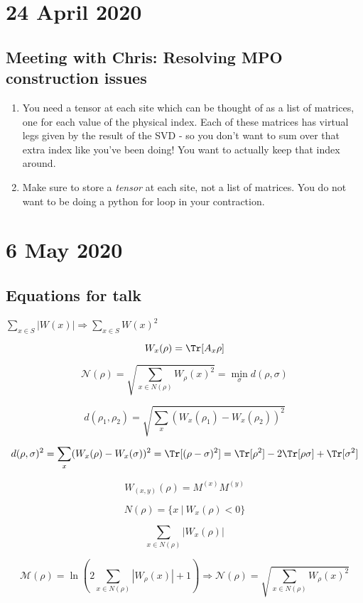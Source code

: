 \documentclass{report}
\begin{document}
\chapter{24 April 2020}

\section{Meeting with Chris: Resolving MPO construction issues}

\begin{enumerate}
\item You need a tensor at each site which can be thought of as a list of matrices, one for each value of the physical index. Each of these matrices has virtual legs given by the result of the SVD - so you don't want to sum over that extra index like you've been doing! You want to actually keep that index around. 
\item Make sure to store a \textit{tensor} at each site, not a list of matrices. You do not want to be doing a python for loop in your contraction.
\end{enumerate}

\chapter{6 May 2020}

\section{Equations for talk}

$\sum_{x\in S} |W(x)|\Rightarrow \sum_{x\in S} W(x)^2$

\[W_x(\rho)=\Tr[A_x\rho]\]

\[\mathcal N(\rho)=\sqrt{\sum_{x\in N(\rho)} W_\rho(x)^2}=\min_\sigma d(\rho,\sigma)\]

\[d(\rho_1,\rho_2)=\sqrt{\sum_x(W_x(\rho_1)-W_x(\rho_2))^2}\]

\[d(\rho,\sigma)^2=\sum_x(W_x(\rho)-W_x(\sigma))^2=\Tr[(\rho-\sigma)^2]=\Tr[\rho^2]-2\Tr[\rho\sigma]+\Tr[\sigma^2]\]

\[W_{(x,y)}(\rho)=M^{(x)}M^{(y)}\]

\[N(\rho)=\{x\ |\ W_x(\rho)<0\}\]

\[\sum_{x\in N(\rho)}|W_x(\rho)|\]

\[\mathcal M(\rho)=\ln\left(2 \sum_{x\in N(\rho)}|W_\rho(x)|+1\right)\Rightarrow \mathcal N(\rho)=\sqrt{\sum_{x\in N(\rho)} W_\rho(x)^2}\]
\end{document}
